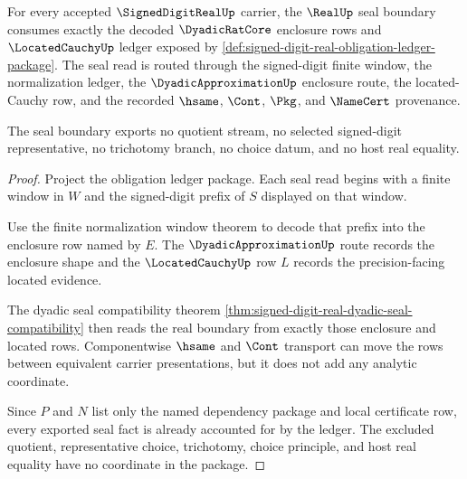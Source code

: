 \begin{theorem}
\label{thm:signed-digit-real-seal-ledger-exactness}
For every accepted $\SignedDigitRealUp$ carrier, the $\RealUp$ seal boundary consumes exactly the decoded $\DyadicRatCore$ enclosure rows and $\LocatedCauchyUp$ ledger exposed by \autoref{def:signed-digit-real-obligation-ledger-package}. The seal read is routed through the signed-digit finite window, the normalization ledger, the $\DyadicApproximationUp$ enclosure route, the located-Cauchy row, and the recorded $\hsame$, $\Cont$, $\Pkg$, and $\NameCert$ provenance.

The seal boundary exports no quotient stream, no selected signed-digit representative, no trichotomy branch, no choice datum, and no host real equality.
\end{theorem}
\begin{proof}
Project the obligation ledger package. Each seal read begins with a finite window in $W$ and the signed-digit prefix of $S$ displayed on that window.

Use the finite normalization window theorem to decode that prefix into the enclosure row named by $E$. The $\DyadicApproximationUp$ route records the enclosure shape and the $\LocatedCauchyUp$ row $L$ records the precision-facing located evidence.

The dyadic seal compatibility theorem \autoref{thm:signed-digit-real-dyadic-seal-compatibility} then reads the real boundary from exactly those enclosure and located rows. Componentwise $\hsame$ and $\Cont$ transport can move the rows between equivalent carrier presentations, but it does not add any analytic coordinate.

Since $P$ and $N$ list only the named dependency package and local certificate row, every exported seal fact is already accounted for by the ledger. The excluded quotient, representative choice, trichotomy, choice principle, and host real equality have no coordinate in the package.
\end{proof}

